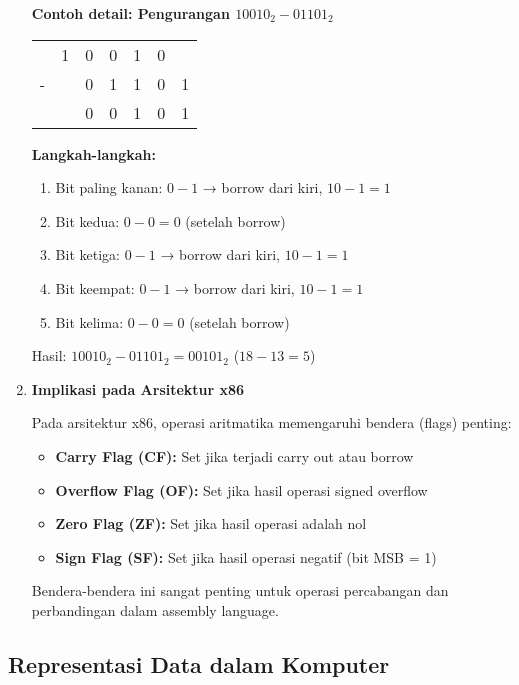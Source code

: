 \documentclass[../main.tex]{subfiles}
\begin{document}
\begin{enumerate}
\textbf{Contoh detail: Pengurangan \(10010_2 - 01101_2\)}

\begin{center}
\begin{tabular}{ccccccc}
  & 1 & 0 & 0 & 1 & 0 & \\
- &   & 0 & 1 & 1 & 0 & 1 \\
\hline
  &   & 0 & 0 & 1 & 0 & 1 \\
\end{tabular}
\end{center}

\textbf{Langkah-langkah:}
\begin{enumerate}
    \item Bit paling kanan: \(0 - 1\) → borrow dari kiri, \(10 - 1 = 1\)
    \item Bit kedua: \(0 - 0 = 0\) (setelah borrow)
    \item Bit ketiga: \(0 - 1\) → borrow dari kiri, \(10 - 1 = 1\)
    \item Bit keempat: \(0 - 1\) → borrow dari kiri, \(10 - 1 = 1\)
    \item Bit kelima: \(0 - 0 = 0\) (setelah borrow)
\end{enumerate}

Hasil: \(10010_2 - 01101_2 = 00101_2\) (\(18 - 13 = 5\))

\item \textbf{Implikasi pada Arsitektur x86}

Pada arsitektur x86, operasi aritmatika memengaruhi bendera (flags) penting:
\begin{itemize}
    \item \textbf{Carry Flag (CF):} Set jika terjadi carry out atau borrow
    \item \textbf{Overflow Flag (OF):} Set jika hasil operasi signed overflow
    \item \textbf{Zero Flag (ZF):} Set jika hasil operasi adalah nol
    \item \textbf{Sign Flag (SF):} Set jika hasil operasi negatif (bit MSB = 1)
\end{itemize}

Bendera-bendera ini sangat penting untuk operasi percabangan dan perbandingan dalam assembly language.
\end{enumerate}

\subsection{Representasi Data dalam Komputer}\label{subsec:pengenalan-representasi-data}
\end{document}
